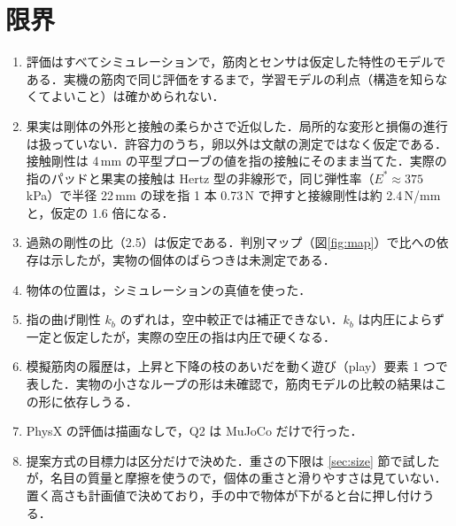 \documentclass[a4paper,twocolumn,10pt]{ltjsarticle}
\begin{document}
\section{限界}
\begin{enumerate}[label=(\roman*)]
\item 評価はすべてシミュレーションで，筋肉とセンサは仮定した特性のモデルである．実機の筋肉で同じ評価をするまで，学習モデルの利点（構造を知らなくてよいこと）は確かめられない．
\item 果実は剛体の外形と接触の柔らかさで近似した．局所的な変形と損傷の進行は扱っていない．許容力のうち，卵以外は文献の測定ではなく仮定である．接触剛性は 4\,mm の平型プローブの値を指の接触にそのまま当てた．実際の指のパッドと果実の接触は Hertz 型の非線形で，同じ弾性率（$E^*\approx375$\,kPa）で半径 22\,mm の球を指 1 本 0.73\,N で押すと接線剛性は約 2.4\,N/mm と，仮定の 1.6 倍になる．
\item 過熟の剛性の比（2.5）は仮定である．判別マップ（図\ref{fig:map}）で比への依存は示したが，実物の個体のばらつきは未測定である．
\item 物体の位置は，シミュレーションの真値を使った．
\item 指の曲げ剛性 $k_b$ のずれは，空中較正では補正できない．$k_b$ は内圧によらず一定と仮定したが，実際の空圧の指は内圧で硬くなる．
\item 模擬筋肉の履歴は，上昇と下降の枝のあいだを動く遊び（play）要素 1 つで表した．実物の小さなループの形は未確認で，筋肉モデルの比較の結果はこの形に依存しうる．
\item PhysX の評価は描画なしで，Q2 は MuJoCo だけで行った．
\item 提案方式の目標力は区分だけで決めた．重さの下限は \ref{sec:size} 節で試したが，名目の質量と摩擦を使うので，個体の重さと滑りやすさは見ていない．置く高さも計画値で決めており，手の中で物体が下がると台に押し付けうる．
\end{enumerate}
\end{document}
